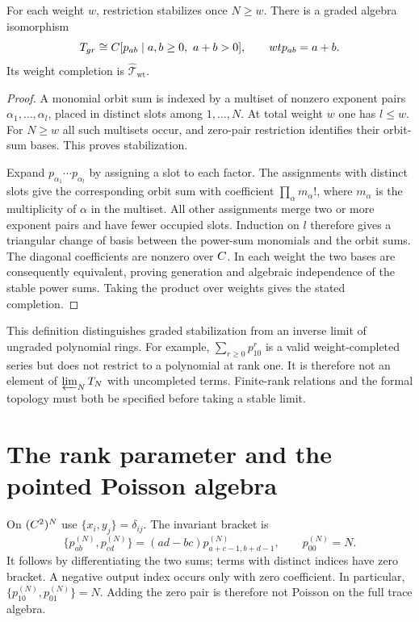 \begin{theorem}
For each weight $w$, restriction stabilizes once $N\ge w$.
There is a graded algebra isomorphism
\[
 \mathcal T_{\mathrm{gr}}
 \cong\C[p_{ab}\mid a,b\ge0,\ a+b>0],
 \qquad \operatorname{wt}p_{ab}=a+b.
\]
Its weight completion is $\widehat{\mathcal T}_{\mathrm{wt}}$.
\end{theorem}
\begin{proof}
A monomial orbit sum is indexed by a multiset of nonzero exponent
pairs $\alpha_1,\ldots,\alpha_l$, placed in distinct slots among
$1,\ldots,N$.  At total weight $w$ one has $l\le w$.
For $N\ge w$ all such multisets occur, and zero-pair restriction
identifies their orbit-sum bases.  This proves stabilization.

Expand $p_{\alpha_1}\cdots p_{\alpha_l}$ by assigning a slot to each
factor.  The assignments with distinct slots give the corresponding
orbit sum with coefficient $\prod_\alpha m_\alpha!$, where
$m_\alpha$ is the multiplicity of $\alpha$ in the multiset.
All other assignments merge two or more exponent pairs and have
fewer occupied slots.  Induction on $l$ therefore gives a triangular
change of basis between the power-sum monomials and the orbit sums.
The diagonal coefficients are nonzero over $\C$.
In each weight the two bases are consequently equivalent, proving
generation and algebraic independence of the stable power sums.
Taking the product over weights gives the stated completion.
\end{proof}

This definition distinguishes graded stabilization from an inverse
limit of ungraded polynomial rings.  For example,
$\sum_{r\ge0}p_{10}^r$ is a valid weight-completed series but does
not restrict to a polynomial at rank one.  It is therefore not an
element of $\varprojlim_N\mathcal T_N$ with uncompleted terms.
Finite-rank relations and the formal topology must both be specified
before taking a stable limit.

\section{The rank parameter and the pointed Poisson algebra}
On $(\C^2)^N$ use $\{x_i,y_j\}=\delta_{ij}$.
The invariant bracket is
\[
 \{p_{ab}^{(N)},p_{cd}^{(N)}\}
 =(ad-bc)p_{a+c-1,b+d-1}^{(N)},
 \qquad p_{00}^{(N)}=N.
\]
It follows by differentiating the two sums; terms with distinct
indices have zero bracket.  A negative output index occurs only
with zero coefficient.
In particular,
$\{p_{10}^{(N)},p_{01}^{(N)}\}=N$.
Adding the zero pair is therefore not Poisson on the full trace algebra.

